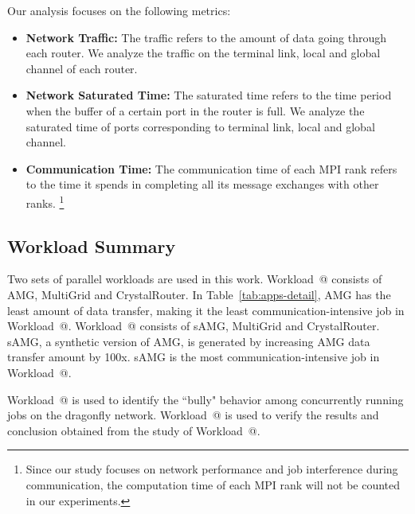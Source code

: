 \documentclass[conference,compsoc]{IEEEtran}
\makeatletter
\newcommand{\Rmnum}[1]{\expandafter\@slowromancap\romannumeral #1@}
\makeatother
\begin{document}
Our analysis focuses on the following metrics:
\begin{itemize}

    \item \textbf{Network Traffic:} The traffic refers to the amount of data going through each router. We analyze the traffic on the terminal link, local and global channel of each router.
        
    \item \textbf{Network Saturated Time:} The saturated time refers to the time period when the buffer of a certain port in the router is full. We analyze the saturated time of ports corresponding to terminal link, local and global channel. 
    
    \item \textbf{Communication Time:} The communication time of each MPI rank refers to the time it spends in completing all its message exchanges with other ranks. \footnote{Since our study focuses on network performance and job interference during communication, the computation time of each MPI rank will not be counted in our experiments.
}

\end{itemize}



\subsection{Workload Summary}
\label{sec:workload summary}

Two sets of parallel workloads are used in this work. Workload~\Rmnum{1} consists of AMG, MultiGrid and CrystalRouter. In Table~\ref{tab:apps-detail}, AMG has the least amount of data transfer, making it the least communication-intensive job in Workload~\Rmnum{1}. Workload~\Rmnum{2} consists of sAMG, MultiGrid and CrystalRouter. sAMG, a synthetic version of AMG, is generated by increasing AMG data transfer amount by 100x. sAMG is the most communication-intensive job in Workload~\Rmnum{2}. 

Workload~\Rmnum{1} is used to identify the ``bully" behavior among concurrently running jobs on the dragonfly network. Workload~\Rmnum{2} is used to verify the results and conclusion obtained from the study of Workload~\Rmnum{1}.

\end{document}
